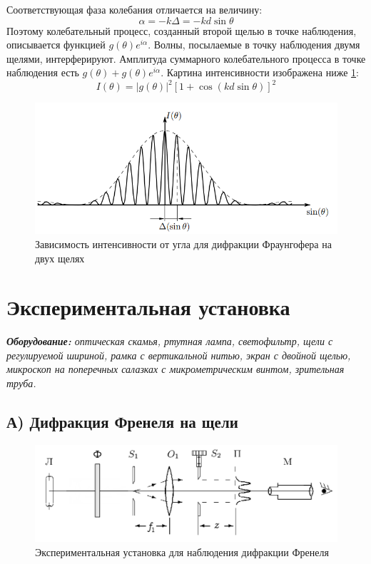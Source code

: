 Соответствующая фаза колебания отличается на величину:
\begin{equation}
    \alpha = -k\Delta = -k d\sin\theta
\end{equation}
Поэтому колебательный процесс, созданный второй щелью в точке наблюдения, описывается функцией $g(\theta)e^{i\alpha}$. Волны, посылаемые в точку наблюдения двумя щелями, интерферируют. Амплитуда суммарного колебательного процесса в точке наблюдения есть $g(\theta) + g(\theta)e^{i\alpha}$.
Картина интенсивности изображена ниже \ref{fig:intensity_fraungofer}:
\begin{equation}
    I(\theta) = |g(\theta)|^2 [1 + \cos(kd\sin\theta)]^2
\end{equation}
\begin{figure}[h!]
    \centering
    \includegraphics[width=14cm]{images/intensity_fraungofer.png}
    \caption{Зависимость интенсивности от угла для дифракции Фраунгофера на двух щелях}\label{fig:intensity_fraungofer}
\end{figure}





\section*{Экспериментальная установка}
\textit{\textbf{Оборудование:} оптическая скамья, ртутная лампа, светофильтр, щели с регулируемой шириной, рамка с вертикальной нитью, экран с двойной щелью, микроскоп на поперечных салазках с микрометрическим винтом, зрительная труба.}

\subsection*{А) Дифракция Френеля на щели}

\begin{figure}[h!]
\centering
\includegraphics[width=12cm]{images/setup.png}
\caption{Экспериментальная установка для наблюдения дифракции Френеля}\label{fig:setup}
\end{figure}

